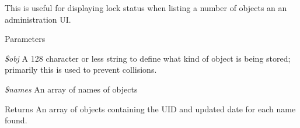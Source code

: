 This is useful for displaying lock status when listing a number of objects an an administration UI.


\begin{DoxyParams}{Parameters}
\item[{\em \$obj}]A 128 character or less string to define what kind of object is being stored; primarily this is used to prevent collisions. \item[{\em \$names}]An array of names of objects\end{DoxyParams}
\begin{DoxyReturn}{Returns}
An array of objects containing the UID and updated date for each name found. 
\end{DoxyReturn}
